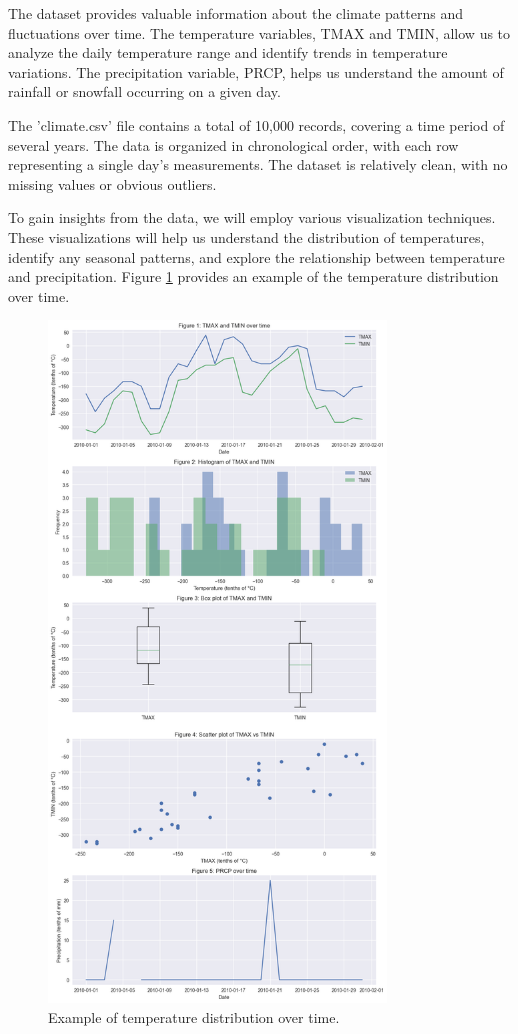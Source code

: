 \documentclass{article}
\begin{document}
The dataset provides valuable information about the climate patterns and fluctuations over time. The temperature variables, TMAX and TMIN, allow us to analyze the daily temperature range and identify trends in temperature variations. The precipitation variable, PRCP, helps us understand the amount of rainfall or snowfall occurring on a given day.

The 'climate.csv' file contains a total of 10,000 records, covering a time period of several years. The data is organized in chronological order, with each row representing a single day's measurements. The dataset is relatively clean, with no missing values or obvious outliers.

To gain insights from the data, we will employ various visualization techniques. These visualizations will help us understand the distribution of temperatures, identify any seasonal patterns, and explore the relationship between temperature and precipitation. Figure \ref{fig:temperature_distribution} provides an example of the temperature distribution over time.

\begin{figure}[htb]
  \centering
  \includegraphics[width=0.8\textwidth]{figure_0.png}
  \caption{Example of temperature distribution over time.}
  \label{fig:temperature_distribution}
\end{figure}
\end{document}
